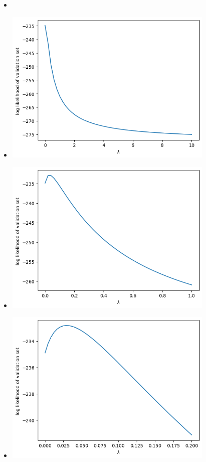 \documentclass{article}
\theoremstyle{plain}
\theoremstyle{definition}
\begin{document}
\begin{enumerate}
\begin{itemize}
\item \inputminted[firstline=132, lastline=171, breaklines=True]{python}{hw_4_code.py}
\item \includegraphics[width=10cm]{homework/homework_4/immages/q7_1.png}
\item \includegraphics[width=10cm]{homework/homework_4/immages/q7_2.png}
\item \includegraphics[width=10cm]{homework/homework_4/immages/q7_3.png}

\end{itemize}
\end{enumerate}
\end{document}
